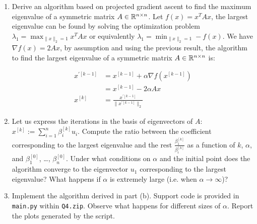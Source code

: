 \documentclass[12pt,twoside]{article}
\begin{document}
\begin{enumerate}
\begin{enumerate}
\item Derive an algorithm based on projected gradient ascent to find the maximum eigenvalue of a symmetric matrix $A\in \mathbb{R}^{n \times n}$.
Let $f(x) = x^T A x$, the largest eigenvalue can be found by solving the optimization problem $\lambda_1= \max _{\|x\|_2=1} x^T A x$ or equivalently $\lambda_1 = \min_{\|x\|_2=1}  - f(x)$.
We have $\nabla{f(x)} = 2 A x$, by assumption and using the previous result, the algorithm to find the largest eigenvalue of a symmetric matrix $A\in \mathbb{R}^{n \times n}$ is:

\begin{align*}
	x^{'[k-1]}	&= x^{[k-1]} + \alpha \nabla{f(x^{[k-1]} )} \\
			&= x^{[k-1]} -2 \alpha A x \\
	x^{[k]}	&= \frac{x^{'[k-1]}}{\|x^{'[k-1]}\|_2}	
\end{align*}


\item Let us express the iterations in the basis of eigenvectors of $A$: $x^{[k]} := \sum_{i=1}^{n}\beta_i^{[k]} u_i$. Compute the ratio between the coefficient corresponding to the largest eigenvalue and the rest $\frac{\beta_1^{[k]}}{\beta_i^{[k]}}$ as a function of $k$, $\alpha$, and $\beta_1^{[0]}$, \ldots, $\beta_n^{[0]}$. Under what conditions on $\alpha$ and the initial point does the algorithm converge to the eigenvector $u_1$ corresponding to the largest eigenvalue? What happens if $\alpha$ is extremely large (i.e. when $\alpha \rightarrow \infty$)?
\item Implement the algorithm derived in part (b). Support code is provided in {\tt main.py} within {\tt Q4.zip}. Observe what happens for different sizes of $\alpha$. Report the plots generated by the script.
\end{enumerate}

\end{enumerate}
\end{document}

